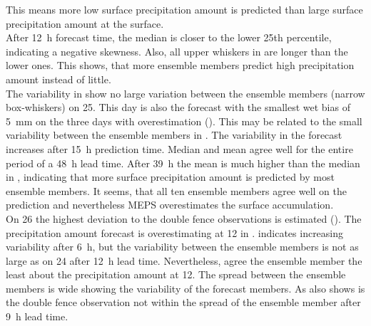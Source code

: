 This means more low surface precipitation amount is predicted than large surface precipitation amount at the surface.
\\
After \SI{12}{\hour} forecast time, the median is closer to the lower 25th percentile, indicating a negative skewness. Also, all upper whiskers in  are longer than the lower ones. %
This shows, that more ensemble members predict high precipitation amount instead of little.
\\
The variability in  show no large variation between the ensemble members (narrow box-whiskers) on \SI{25}{\dec}. This day is also the forecast with the smallest wet bias of \SI{5}{\mm} on the three days with overestimation (). This may be related to the small variability between the ensemble members in . 
The variability in the forecast increases after \SI{15}{\hour} prediction time. %
Median and mean agree well for the entire period of a \SI{48}{\hour} lead time. After \SI{39}{\hour} the mean is much higher than the median in , indicating that more surface precipitation amount is predicted by most ensemble members. %
It seems, that all ten ensemble members agree well on the prediction and nevertheless MEPS overestimates the surface accumulation. 
\\
On \SI{26}{\dec} the highest deviation to the double fence observations is estimated (). The precipitation amount forecast is overestimating at \SI{12}{\UTC} in .  indicates increasing variability after \SI{6}{\hour}, but the variability between the ensemble members is not as large as on \SI{24}{\dec} after \SI{12}{\hour} lead time. Nevertheless, agree the ensemble member the least about the precipitation amount at \SI{12}{\UTC}. The spread between the ensemble members is wide showing the variability of the forecast members. As  also shows is the double fence observation not within the spread of the ensemble member after \SI{9}{\hour} lead time. 
